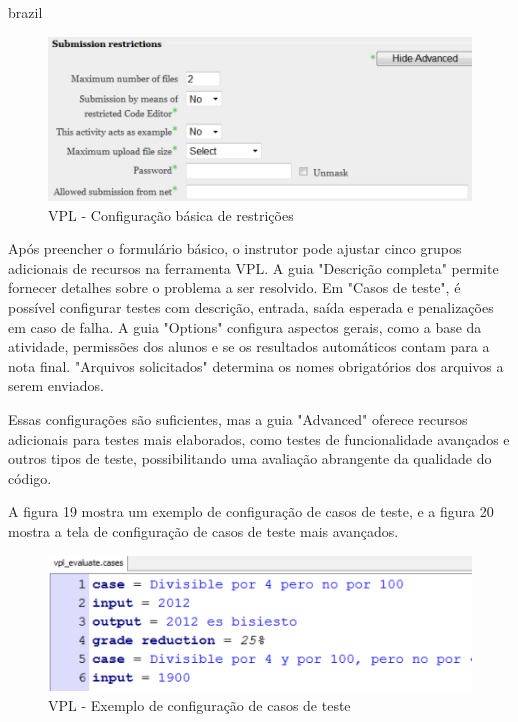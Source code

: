\begin{otherlanguage*}{brazil}
\begin{figure}[h!]
	   \centering
            \caption{VPL - Configuração básica de restrições}
            \label{fig:ModeloConceitual}
	   	\includegraphics[scale=0.5]{pictures/VPL_config_basica.png}
\end{figure}

Após preencher o formulário básico, o instrutor pode ajustar cinco grupos adicionais de recursos na ferramenta VPL. A guia "Descrição completa" permite fornecer detalhes sobre o problema a ser resolvido. Em "Casos de teste", é possível configurar testes com descrição, entrada, saída esperada e penalizações em caso de falha. A guia "Options" configura aspectos gerais, como a base da atividade, permissões dos alunos e se os resultados automáticos contam para a nota final. "Arquivos solicitados" determina os nomes obrigatórios dos arquivos a serem enviados. 

Essas configurações são suficientes, mas a guia "Advanced" oferece recursos adicionais para testes mais elaborados, como testes de funcionalidade avançados e outros tipos de teste, possibilitando uma avaliação abrangente da qualidade do código.

A figura 19 mostra um exemplo de configuração de casos de teste, e a figura 20 mostra a tela de configuração de casos de teste mais avançados.

\begin{figure}[h!]
	   \centering
            \caption{VPL - Exemplo de configuração de casos de teste}
            \label{fig:ModeloConceitual}
	   	\includegraphics[scale=0.5]{pictures/VPL_testes.png}
\end{figure}


\end{otherlanguage*}

